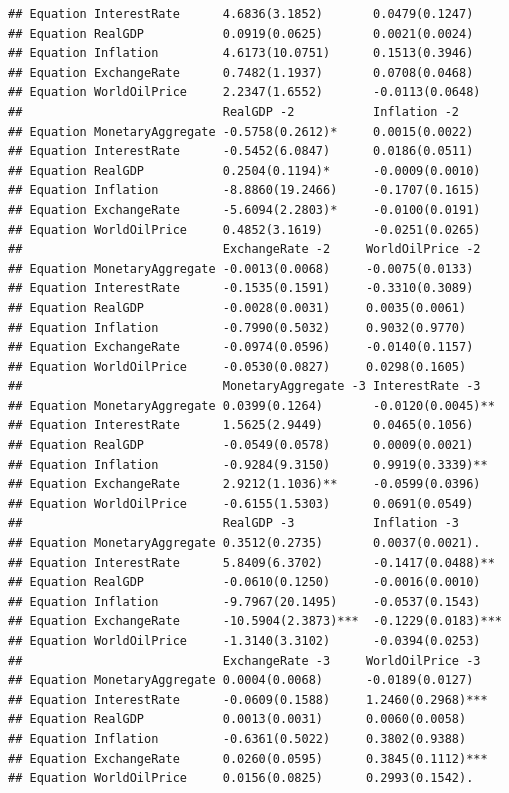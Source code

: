 \documentclass[11pt,preprint, authoryear]{elsarticle}
\numberwithin{equation}{section}
\numberwithin{figure}{section}
\numberwithin{table}{section}
\begin{document}
\begin{verbatim}
## Equation InterestRate      4.6836(3.1852)       0.0479(0.1247)     
## Equation RealGDP           0.0919(0.0625)       0.0021(0.0024)     
## Equation Inflation         4.6173(10.0751)      0.1513(0.3946)     
## Equation ExchangeRate      0.7482(1.1937)       0.0708(0.0468)     
## Equation WorldOilPrice     2.2347(1.6552)       -0.0113(0.0648)    
##                            RealGDP -2           Inflation -2       
## Equation MonetaryAggregate -0.5758(0.2612)*     0.0015(0.0022)     
## Equation InterestRate      -0.5452(6.0847)      0.0186(0.0511)     
## Equation RealGDP           0.2504(0.1194)*      -0.0009(0.0010)    
## Equation Inflation         -8.8860(19.2466)     -0.1707(0.1615)    
## Equation ExchangeRate      -5.6094(2.2803)*     -0.0100(0.0191)    
## Equation WorldOilPrice     0.4852(3.1619)       -0.0251(0.0265)    
##                            ExchangeRate -2     WorldOilPrice -2   
## Equation MonetaryAggregate -0.0013(0.0068)     -0.0075(0.0133)    
## Equation InterestRate      -0.1535(0.1591)     -0.3310(0.3089)    
## Equation RealGDP           -0.0028(0.0031)     0.0035(0.0061)     
## Equation Inflation         -0.7990(0.5032)     0.9032(0.9770)     
## Equation ExchangeRate      -0.0974(0.0596)     -0.0140(0.1157)    
## Equation WorldOilPrice     -0.0530(0.0827)     0.0298(0.1605)     
##                            MonetaryAggregate -3 InterestRate -3    
## Equation MonetaryAggregate 0.0399(0.1264)       -0.0120(0.0045)**  
## Equation InterestRate      1.5625(2.9449)       0.0465(0.1056)     
## Equation RealGDP           -0.0549(0.0578)      0.0009(0.0021)     
## Equation Inflation         -0.9284(9.3150)      0.9919(0.3339)**   
## Equation ExchangeRate      2.9212(1.1036)**     -0.0599(0.0396)    
## Equation WorldOilPrice     -0.6155(1.5303)      0.0691(0.0549)     
##                            RealGDP -3           Inflation -3       
## Equation MonetaryAggregate 0.3512(0.2735)       0.0037(0.0021).    
## Equation InterestRate      5.8409(6.3702)       -0.1417(0.0488)**  
## Equation RealGDP           -0.0610(0.1250)      -0.0016(0.0010)    
## Equation Inflation         -9.7967(20.1495)     -0.0537(0.1543)    
## Equation ExchangeRate      -10.5904(2.3873)***  -0.1229(0.0183)*** 
## Equation WorldOilPrice     -1.3140(3.3102)      -0.0394(0.0253)    
##                            ExchangeRate -3     WorldOilPrice -3   
## Equation MonetaryAggregate 0.0004(0.0068)      -0.0189(0.0127)    
## Equation InterestRate      -0.0609(0.1588)     1.2460(0.2968)***  
## Equation RealGDP           0.0013(0.0031)      0.0060(0.0058)     
## Equation Inflation         -0.6361(0.5022)     0.3802(0.9388)     
## Equation ExchangeRate      0.0260(0.0595)      0.3845(0.1112)***  
## Equation WorldOilPrice     0.0156(0.0825)      0.2993(0.1542).
\end{verbatim}
\end{document}
